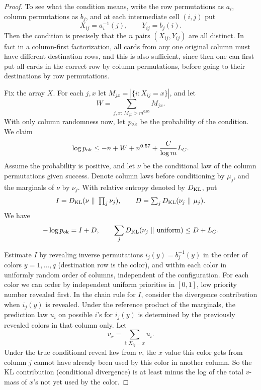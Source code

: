 \begin{proof}\label{tra:inverse-color:compatibility-proof}
\label{tra:inverse-color:inverse-column-entropy-and-repeat-moment}
To see what the condition means, write the row permutations as \(a_i\), column permutations as \(b_j\), and at each intermediate cell \((i,j)\) put
\[
                    X_{ij}=a_i^{-1}(j),\qquad Y_{ij}=b_j(i).
\]
Then the condition is precisely that the \(n\) pairs \((X_{ij},Y_{ij})\) are all distinct. In fact in a column-first factorization, all cards from any one original column must have different destination rows, and this is also sufficient, since then one can first put all cards in the correct row by column permutations, before going to their destinations by row permutations.

Fix the array \(X\). For each \(j,x\) let \(M_{jx}=|\{i:X_{ij}=x\}|\), and let
\[
                   W=\sum_{j,x:\ M_{jx}>m^{0.05}} M_{jx}.
\]
With only column randomness now, let \(p_{\rm ok}\) be the probability of the condition. We claim
\begin{equation}
                \log p_{\rm ok}
                  \le -n+W+n^{0.57}+\frac{C}{\log m}L_C .                       \label{tra:inverse-color:eq2}
\end{equation}
Assume the probability is positive, and let \(\nu\) be the conditional law of the column permutations given success. Denote column laws before conditioning by \(\mu_j\), and the marginals of \(\nu\) by \(\nu_j\). With relative entropy denoted by \(D_{\rm KL}\), put
\[
         I=D_{\rm KL}(\nu\ \|\ \textstyle\prod_j\nu_j),\qquad
         D=\sum_j D_{\rm KL}(\nu_j\ \|\ \mu_j).
\]
We have
\begin{equation}
 -\log p_{\rm ok}=I+D,\qquad
 \sum_j D_{\rm KL}(\nu_j\ \|\ \text{uniform})\le D+L_C .                       \label{tra:inverse-color:eq3}
\end{equation}

Estimate \(I\) by revealing inverse permutations \(i_j(y)=b_j^{-1}(y)\) in the order of colors \(y=1,\ldots,q\) (destination row is the color), and within each color in uniformly random order of columns, independent of the configuration. For each color we can order by independent uniform priorities in \([0,1]\), low priority number revealed first. In the chain rule for \(I\), consider the divergence contribution when \(i_j(y)\) is revealed. Under the reference product of the marginals, the prediction law \(u_i\) on possible \(i\)'s for \(i_j(y)\) is determined by the previously revealed colors in that column only. Let
\[
                          v_x=\sum_{i:X_{ij}=x} u_i.
\]
Under the true conditional reveal law from \(\nu\), the \(x\) value this color gets from column \(j\) cannot have already been used by this color in another column. So the KL contribution (conditional divergence) is at least minus the log of the total \(v\)-mass of \(x\)'s not yet used by the color.


\end{proof}
